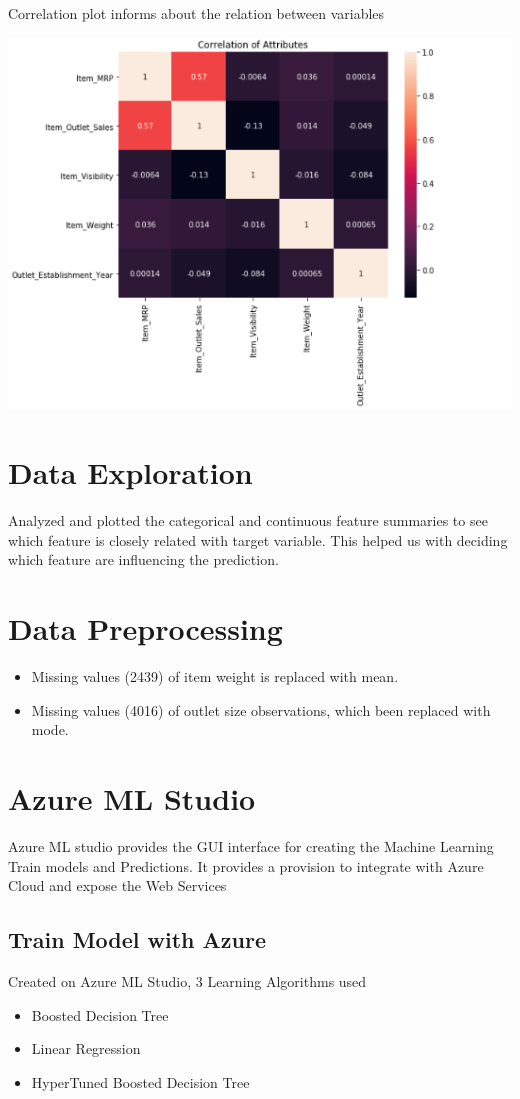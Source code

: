 Correlation plot informs about the relation between variables 

\includegraphics[width=\columnwidth]{Images/mlstudio/Correlation.png}


\section{Data Exploration}
Analyzed and plotted the categorical and continuous feature summaries to 
see which feature is 
closely related with target variable. This helped us with deciding which 
feature are influencing 
the prediction.

\section{Data Preprocessing}
\begin{itemize}
\item Missing values (2439) of item weight is replaced with mean.
\item Missing values (4016) of outlet size observations, which been 
replaced with mode.
\end{itemize}


\section{Azure ML Studio}
Azure ML studio provides the GUI interface for creating the Machine 
Learning Train models and Predictions. It provides a provision to integrate 
with Azure Cloud and expose the Web Services

\subsection{Train Model with Azure}
Created on Azure ML Studio, 3 Learning Algorithms used
\begin{itemize}
\item Boosted Decision Tree
\item Linear Regression
\item HyperTuned Boosted Decision Tree
\end{itemize}

